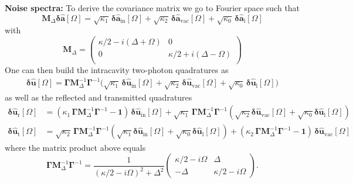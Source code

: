 \noindent \textbf{Noise spectra: }To derive the covariance matrix we go to Fourier space such that 
\begin{equation}
     \mathbf{M}_\Delta \mathbf{\delta \hat{a}}[\Omega]  = \sqrt{\kappa_{\mathrm{1}}} \, \mathbf{\delta \hat{a}_{\mathrm{in}}}[\Omega]  + \sqrt{\kappa_2} \, \mathbf{\delta \hat{a}_{\mathrm{vac}}}[\Omega]   + \sqrt{\kappa_0} \, \mathbf{\delta \hat{a}_{\mathrm{l}}}[\Omega]   
\end{equation}
with 
\begin{equation}
  \mathbf{M}_\Delta =\begin{pmatrix}
  \kappa/2-i(\Delta+\Omega) & 0 \\ 
  0 & \kappa/2+i(\Delta-\Omega)\\ 
  \end{pmatrix} 
\end{equation}
One can then build the intracavity two-photon quadratures as 
\begin{equation}
  \begin{split}
  \mathbf{\delta \hat{u}}[\Omega]  = \mathbf{\Gamma} \mathbf{M}^{-1}_\Delta \mathbf{\Gamma}^{-1} \Big( \sqrt{\kappa_1} \, \mathbf{\delta \hat{u}_{\mathrm{in}}}[\Omega] +  \sqrt{\kappa_2} \, \mathbf{\delta \hat{u}_{\mathrm{vac}}}[\Omega] +  \sqrt{\kappa_0} \, \mathbf{\delta \hat{u}_{\mathrm{l}}}[\Omega] \Big)
\end{split}
\end{equation}
as well as the reflected and transmitted quadratures 
\begin{equation}
  \begin{split}
  \mathbf{\delta \hat{u}_{\mathrm{r}}}[\Omega]  &= ( \kappa_1 \, \mathbf{\Gamma} \mathbf{M}^{-1}_\Delta \mathbf{\Gamma}^{-1}- \mathbf{1} )\, \mathbf{\delta \hat{u}_{\mathrm{in}}}[\Omega] +  \sqrt{\kappa_1} \,\mathbf{\Gamma}  \mathbf{M}^{-1}_\Delta \mathbf{\Gamma}^{-1} (\sqrt{\kappa_2} \mathbf{\delta \hat{u}_{\mathrm{vac}}}[\Omega] + \sqrt{\kappa_0}  \mathbf{\delta \hat{u}_{\mathrm{l}}}[\Omega] ) \\
  \mathbf{\delta \hat{u}_{\mathrm{t}}}[\Omega] & =  \sqrt{\kappa_2} \,\mathbf{\Gamma}  \mathbf{M}^{-1}_\Delta \mathbf{\Gamma}^{-1} (\sqrt{\kappa_1} \mathbf{\delta \hat{u}_{\mathrm{in}}}[\Omega] + \sqrt{\kappa_0}  \mathbf{\delta \hat{u}_{\mathrm{l}}}[\Omega] ) +  (\kappa_2 \,\mathbf{\Gamma}  \mathbf{M}^{-1}_\Delta \mathbf{\Gamma}^{-1}- \mathbf{1}) \, \mathbf{\delta \hat{u}_{\mathrm{vac}}}[\Omega] 
  \end{split}
\end{equation}
where the matrix product above equals 
\begin{equation}
  \mathbf{\Gamma}  \mathbf{M}^{-1}_\Delta \mathbf{\Gamma}^{-1}
= \frac{1}{\left(\kappa/2-i\Omega\right)^{2}+\Delta^{2}}
\begin{pmatrix}
\kappa/2-i\Omega & \Delta \\[6pt]
-\Delta & \kappa/2-i\Omega
\end{pmatrix}.
\end{equation}


